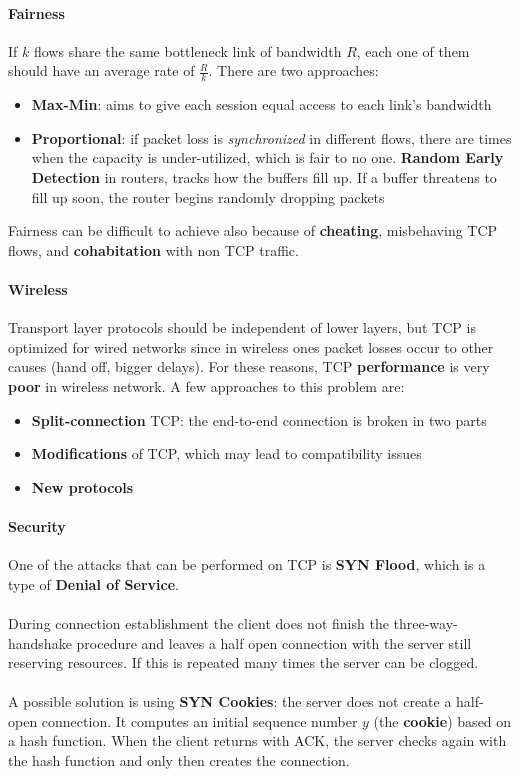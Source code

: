 \paragraph{Fairness} If $k$ flows share the same bottleneck link of bandwidth $R$, each one of them should have an average rate of $\frac{R}{k}$. There are two approaches:
\begin{itemize}
	\item \textbf{Max-Min}: aims to give each session equal access to each link's bandwidth
	\item \textbf{Proportional}: if packet loss is \textit{synchronized} in different flows, there are times when the capacity is under-utilized, which is fair to no one. \textbf{Random Early Detection} in routers, tracks how the buffers fill up. If a buffer threatens to fill up soon, the router begins randomly dropping packets
\end{itemize}
Fairness can be difficult to achieve also because of \textbf{cheating}, misbehaving TCP flows, and \textbf{cohabitation} with non TCP traffic. 

\paragraph{Wireless} Transport layer protocols should be independent of lower layers, but TCP is optimized for wired networks since in wireless ones packet losses occur to other causes (hand off, bigger delays). For these reasons, TCP \textbf{performance} is very \textbf{poor} in wireless network. A few approaches to this problem are:
\begin{itemize}
	\item \textbf{Split-connection} TCP: the end-to-end connection is broken in two parts
	\item \textbf{Modifications} of TCP, which may lead to compatibility issues
	\item \textbf{New protocols}
\end{itemize}

\paragraph{Security} One of the attacks that can be performed on TCP is \textbf{SYN Flood}, which is a type of \textbf{Denial of Service}.\\\\
During connection establishment the client does not finish the three-way-handshake procedure and leaves a half open connection with the server still reserving resources. If this is repeated many times the server can be clogged.\\\\
A possible solution is using \textbf{SYN Cookies}: the server does not create a half-open connection. It computes an initial sequence number $y$ (the \textbf{cookie}) based on a hash function. When the client returns with ACK, the server checks again with the hash function and only then creates the connection.

